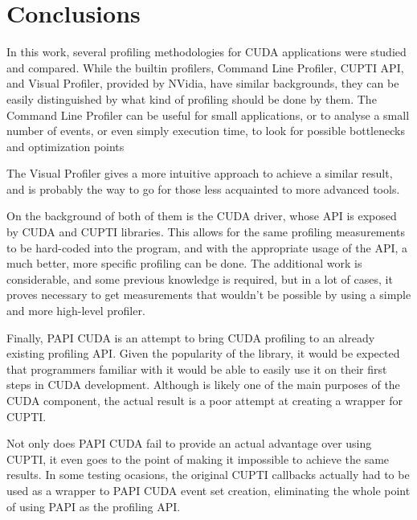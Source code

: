 \section{Conclusions}
\label{sec:anal}%

In this work, several profiling methodologies for CUDA applications were studied and compared. While the builtin profilers, Command Line Profiler, CUPTI API, and Visual Profiler, provided by NVidia, have similar backgrounds, they can be easily distinguished by what kind of profiling should be done by them. 
The Command Line Profiler can be useful for small applications, or to analyse a small number of events, or even simply execution time, to look for possible bottlenecks and optimization points

The Visual Profiler gives a more intuitive approach to achieve a similar result, and is probably the way to go for those less acquainted to more advanced tools.

On the background of both of them is the CUDA driver, whose API is exposed by CUDA and CUPTI libraries. This allows for the same profiling measurements to be hard-coded into the program, and with the appropriate usage of the API, a much better, more specific profiling can be done. The additional work is considerable, and some previous knowledge is required, but in a lot of cases, it proves necessary to get measurements that wouldn't be possible by using a simple and more high-level profiler.

Finally, PAPI CUDA is an attempt to bring CUDA profiling to an already existing profiling API. Given the popularity of the library, it would be expected that programmers familiar with it would be able to easily use it on their first steps in CUDA development. Although is likely one of the main purposes of the CUDA component, the actual result is a poor attempt at creating a wrapper for CUPTI.

Not only does PAPI CUDA fail to provide an actual advantage over using CUPTI, it even goes to the point of making it impossible to achieve the same results. In some testing ocasions, the original CUPTI callbacks actually had to be used as a wrapper to PAPI CUDA event set creation, eliminating the whole point of using PAPI as the profiling API.